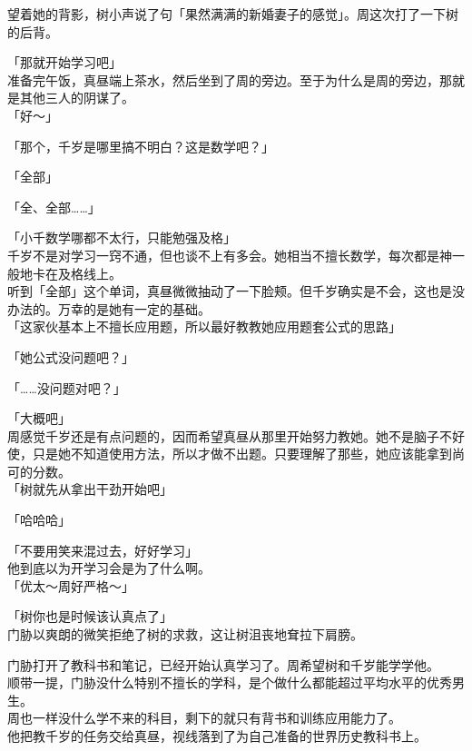 望着她的背影，树小声说了句「果然满满的新婚妻子的感觉」。周这次打了一下树的后背。\\

\vspace{2\baselineskip}

「那就开始学习吧」\\

准备完午饭，真昼端上茶水，然后坐到了周的旁边。至于为什么是周的旁边，那就是其他三人的阴谋了。\\

「好～」

「那个，千岁是哪里搞不明白？这是数学吧？」

「全部」

「全、全部……」

「小千数学哪都不太行，只能勉强及格」\\

千岁不是对学习一窍不通，但也谈不上有多会。她相当不擅长数学，每次都是神一般地卡在及格线上。\\

听到「全部」这个单词，真昼微微抽动了一下脸颊。但千岁确实是不会，这也是没办法的。万幸的是她有一定的基础。\\

「这家伙基本上不擅长应用题，所以最好教教她应用题套公式的思路」

「她公式没问题吧？」

「……没问题对吧？」

「大概吧」\\

周感觉千岁还是有点问题的，因而希望真昼从那里开始努力教她。她不是脑子不好使，只是她不知道使用方法，所以才做不出题。只要理解了那些，她应该能拿到尚可的分数。\\

「树就先从拿出干劲开始吧」

「哈哈哈」

「不要用笑来混过去，好好学习」\\

他到底以为开学习会是为了什么啊。\\

「优太～周好严格～」

「树你也是时候该认真点了」\\

门胁以爽朗的微笑拒绝了树的求救，这让树沮丧地耷拉下肩膀。

门胁打开了教科书和笔记，已经开始认真学习了。周希望树和千岁能学学他。\\

顺带一提，门胁没什么特别不擅长的学科，是个做什么都能超过平均水平的优秀男生。\\

周也一样没什么学不来的科目，剩下的就只有背书和训练应用能力了。\\

他把教千岁的任务交给真昼，视线落到了为自己准备的世界历史教科书上。
